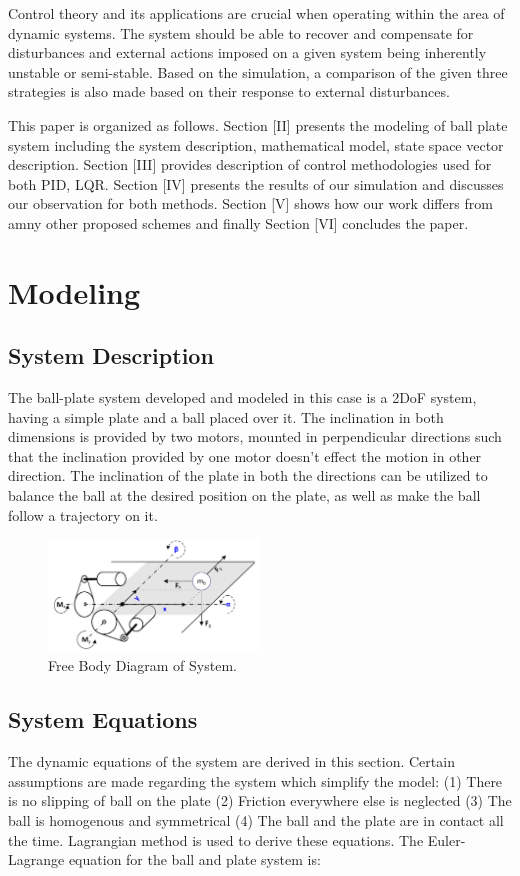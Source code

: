 \documentclass[conference]{IEEEtran}
\begin{document}
Control theory and its applications are crucial when operating within the area of dynamic systems. The system should be able to recover and compensate for disturbances and external actions imposed on a given system being inherently unstable or semi-stable. Based on the simulation, a comparison of the given three strategies is also made based on their response to external disturbances. 

This paper is organized as follows. Section [II] presents the modeling of ball plate system including the system description, mathematical model, state space vector description. Section [III] provides description of control methodologies used for both PID, LQR. Section [IV] presents the results of our simulation and discusses our observation for both methods. Section [V] shows how our work differs from amny other proposed schemes and finally Section [VI] concludes the paper.



\section{Modeling}

\subsection{System Description}

The ball-plate system developed and modeled in this case is a 2DoF system, having a simple plate and a ball placed over it. The inclination in both dimensions is provided by two motors, mounted in perpendicular directions such that the inclination provided by one motor doesn’t effect the motion in other direction. The inclination of the plate in both the directions can be utilized to balance the ball at the desired position on the plate, as well as make the ball follow a trajectory on it.
\begin{figure}[htbp]
\centerline{\includegraphics[width=0.5\textwidth]{FBD.png}}
\caption{Free Body Diagram of System.}
\label{fig1}
\end{figure}

\subsection{System Equations}
The dynamic equations of the system are derived in this section. Certain assumptions are made regarding the system which simplify the model: (1) There is no slipping of ball on the plate (2) Friction everywhere else is neglected (3) The ball is homogenous and symmetrical (4) The ball and the plate are in contact all the time. Lagrangian method is used to derive these equations. The Euler-Lagrange equation for the ball and plate system is: 
\end{document}
